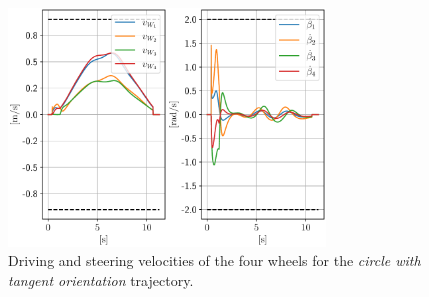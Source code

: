 \begin{figure}
    \centering
    \includegraphics[width=0.75\textwidth]{figures/SWMR/simulations/circular_with_tangent_orientation/wheels_velocities.pdf}
    \caption{Driving and steering velocities of the four wheels for the \textit{circle with tangent orientation} trajectory.}
    \label{fig:simulations:circle-with-tangent-orientation:wheel-velocities}
\end{figure}

